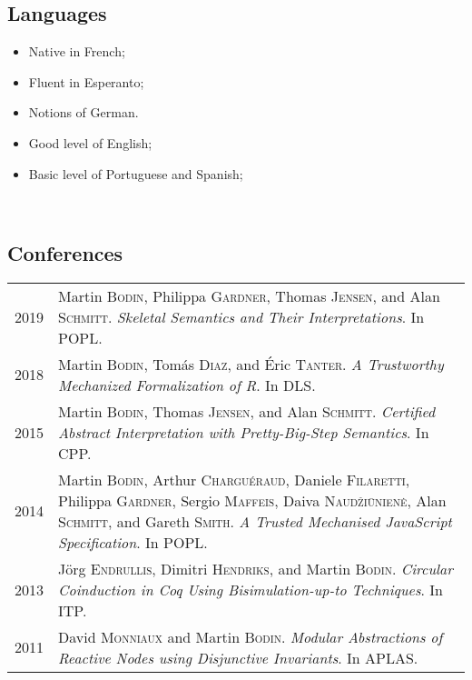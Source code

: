 \documentclass[12pt,a4paper]{article}
\makeatletter
\newenvironment{datecvsection}[1]%
               {\subsection*{#1}%
                 \noindent \begin{tabular}{@{}p{\annee}p{\texte}@{}}}
               {\end{tabular}}
\newenvironment{cvsection}[1]%
               {\subsection*{#1}}
               {}
\makeatother
\begin{document}
\begin{cvsection}{Languages}
\parbox{.4\textwidth}{
\begin{itemize}
   \item Native in French;
   \item Fluent in Esperanto;
   \item Notions of German.
\end{itemize}}
\parbox{.5\textwidth}{
\begin{itemize}
   \item Good level of English;
   \item Basic level of Portuguese and Spanish;
\end{itemize}
~\\}
\end{cvsection}

\begin{datecvsection}{Conferences}

  2019 & Martin \textsc{Bodin}, Philippa \textsc{Gardner}, Thomas \textsc{Jensen}, and Alan \textsc{Schmitt}. \textit{Skeletal Semantics and Their Interpretations}. In POPL. \\

  2018 & Martin \textsc{Bodin}, Tomás \textsc{Diaz}, and Éric \textsc{Tanter}. \textit{A Trustworthy Mechanized Formalization of R}. In DLS. \\

  2015 & Martin \textsc{Bodin}, Thomas \textsc{Jensen}, and Alan \textsc{Schmitt}. \textit{Certified Abstract Interpretation with Pretty-Big-Step Semantics}. In CPP. \\

  2014 & Martin \textsc{Bodin}, Arthur \textsc{Charguéraud}, Daniele \textsc{Filaretti}, Philippa \textsc{Gardner}, Sergio \textsc{Maffeis}, Daiva \textsc{Naudžiūnienė}, Alan \textsc{Schmitt}, and Gareth \textsc{Smith}. \textit{A Trusted Mechanised JavaScript Specification}. In POPL. \\

  2013 & Jörg \textsc{Endrullis}, Dimitri \textsc{Hendriks}, and Martin \textsc{Bodin}. \textit{Circular Coinduction in Coq Using Bisimulation-up-to Techniques}. In ITP. \\

  2011 & David \textsc{Monniaux} and Martin \textsc{Bodin}. \textit{Modular Abstractions of Reactive Nodes using Disjunctive Invariants}. In APLAS. \\

\end{datecvsection}
\end{document}
